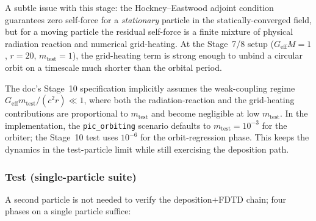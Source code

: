 \documentclass[11pt,a4paper]{article}
\begin{document}
A subtle issue with this stage: the Hockney--Eastwood adjoint condition
guarantees zero self-force for a \emph{stationary} particle in the
statically-converged field, but for a moving particle the residual
self-force is a finite mixture of physical radiation reaction and
numerical grid-heating.  At the Stage~7/8 setup ($G_{\mathrm{eff}} M = 1$,
$r = 20$, $m_{\mathrm{test}} = 1$), the grid-heating term is strong enough
to unbind a circular orbit on a timescale much shorter than the orbital
period.

The doc's Stage~10 specification implicitly assumes the weak-coupling
regime $G_{\mathrm{eff}} m_{\mathrm{test}} / (c^2 r) \ll 1$, where both
the radiation-reaction and the grid-heating contributions are
proportional to $m_{\mathrm{test}}$ and become negligible at low
$m_{\mathrm{test}}$.  In the implementation, the
\texttt{pic\_orbiting} scenario defaults to
$m_{\mathrm{test}} = 10^{-3}$ for the orbiter; the Stage~10 test uses
$10^{-6}$ for the orbit-regression phase.  This keeps the dynamics in
the test-particle limit while still exercising the deposition path.

\subsubsection*{Test (single-particle suite)}

A second particle is not needed to verify the deposition$+$FDTD chain;
four phases on a single particle suffice:
\end{document}
